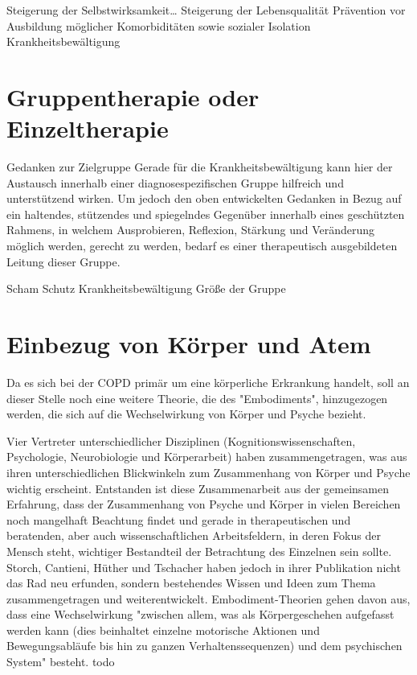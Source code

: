 Steigerung der Selbstwirksamkeit…
Steigerung der Lebensqualität
Prävention vor Ausbildung möglicher Komorbiditäten sowie sozialer Isolation
Krankheitsbewältigung

\section{Gruppentherapie oder Einzeltherapie}
Gedanken zur Zielgruppe
Gerade für die Krankheitsbewältigung kann hier der Austausch innerhalb einer diagnosespezifischen Gruppe hilfreich und unterstützend wirken. Um jedoch den oben entwickelten Gedanken in Bezug auf ein haltendes, stützendes und spiegelndes Gegenüber innerhalb eines geschützten Rahmens, in welchem Ausprobieren, Reflexion, Stärkung und Veränderung möglich werden, gerecht zu werden, bedarf es einer therapeutisch ausgebildeten Leitung dieser Gruppe. 

Scham
Schutz
Krankheitsbewältigung
Größe der Gruppe

\section{Einbezug von Körper und Atem} 
\label{section:einbezug von koerper und atem}
Da es sich bei der COPD primär um eine körperliche Erkrankung handelt, soll an dieser Stelle noch eine weitere Theorie, die des "Embodiments", hinzugezogen werden, die sich auf die Wechselwirkung von Körper und Psyche bezieht. 

Vier Vertreter unterschiedlicher Disziplinen (Kognitionswissenschaften, Psychologie, Neurobiologie und Körperarbeit) haben zusammengetragen, was aus ihren unterschiedlichen Blickwinkeln zum Zusammenhang von Körper und Psyche wichtig erscheint. Entstanden ist diese Zusammenarbeit aus der gemeinsamen Erfahrung, dass der Zusammenhang von Psyche und Körper in vielen Bereichen noch mangelhaft Beachtung findet und gerade in therapeutischen und beratenden, aber auch wissenschaftlichen Arbeitsfeldern, in deren Fokus der Mensch steht, wichtiger Bestandteil der Betrachtung des Einzelnen sein sollte.
Storch, Cantieni, Hüther und Tschacher haben jedoch in ihrer Publikation nicht das Rad neu erfunden, sondern bestehendes Wissen und Ideen zum Thema zusammengetragen und weiterentwickelt. Embodiment-Theorien gehen davon aus, dass eine Wechselwirkung "zwischen allem, was als Körpergeschehen aufgefasst werden kann (dies beinhaltet einzelne motorische Aktionen und Bewegungsabläufe bis hin zu ganzen Verhaltenssequenzen) und dem psychischen System" \autocite[39]{hüther2010} besteht. todo

